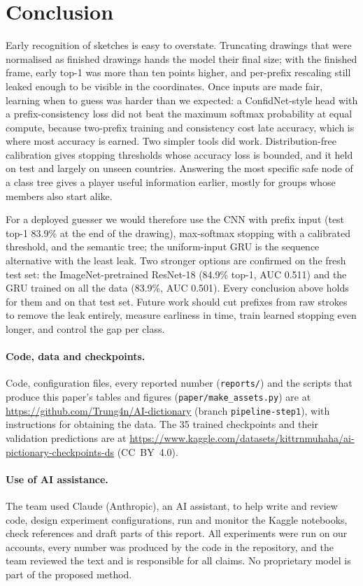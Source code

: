 \section{Conclusion}
\label{sec:conclusion}

Early recognition of sketches is easy to overstate. Truncating drawings that were normalised as
finished drawings hands the model their final size; with the finished frame, early top-1 was more
than ten points higher, and per-prefix rescaling still leaked enough to be visible in the
coordinates. Once inputs are made fair, learning when to guess was harder than we expected: a
ConfidNet-style head with a prefix-consistency loss did not beat the maximum softmax probability
at equal compute, because two-prefix training and consistency cost late accuracy, which is where
most accuracy is earned. Two simpler tools did work. Distribution-free calibration gives stopping
thresholds whose accuracy loss is bounded, and it held on test and largely on unseen countries.
Answering the most specific safe node of a class tree gives a player useful information earlier,
mostly for groups whose members also start alike.

For a deployed guesser we would therefore use the CNN with prefix input (test top-1 83.9\% at
the end of the drawing), max-softmax stopping with a calibrated threshold, and the semantic tree;
the uniform-input GRU is the sequence alternative with the least leak. Two stronger options are
confirmed on the fresh test set: the ImageNet-pretrained ResNet-18 (84.9\% top-1, AUC 0.511) and the
GRU trained on all the data (83.9\%, AUC 0.501). Every conclusion above holds for them and on that
test set. Future work should cut prefixes from raw strokes to remove the leak entirely, measure
earliness in time, train learned stopping even longer, and control the gap per class.

\paragraph{Code, data and checkpoints.}
Code, configuration files, every reported number (\texttt{reports/}) and the scripts that produce
this paper's tables and figures (\texttt{paper/make\_assets.py}) are at
\url{https://github.com/Trung4n/AI-dictionary} (branch \texttt{pipeline-step1}), with instructions
for obtaining the data. The 35 trained checkpoints and their validation predictions are at
\url{https://www.kaggle.com/datasets/kittrnmuhaha/ai-pictionary-checkpoints-ds} (CC~BY~4.0).

\paragraph{Use of AI assistance.}
The team used Claude (Anthropic), an AI assistant, to help write and review code, design
experiment configurations, run and monitor the Kaggle notebooks, check references and draft
parts of this report. All experiments were run on our accounts, every number was produced by
the code in the repository, and the team reviewed the text and is responsible for all claims.
No proprietary model is part of the proposed method.
